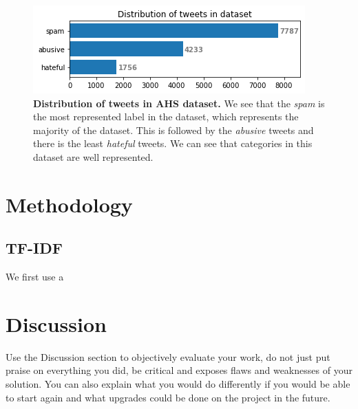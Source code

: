 \documentclass[fleqn,moreauthors,10pt]{ds_report}
\begin{document}
\begin{figure}[ht]\centering
	\includegraphics[width=\linewidth]{distribution_tweets_dataset2.png}
	\caption{\textbf{Distribution of tweets in AHS dataset.} We see that the \textit{spam} is the most represented label in the dataset, which represents the majority of the dataset. This is followed by the \textit{abusive} tweets and there is the least \textit{hateful} tweets. We can see that categories in this dataset are well represented.}
	\label{fig:distribution_tweets_dataset2}
\end{figure}

\section*{Methodology}
\subsection*{TF-IDF}
We first use a 


\section*{Discussion}

Use the Discussion section to objectively evaluate your work, do not just put praise on everything you did, be critical and exposes flaws and weaknesses of your solution. You can also explain what you would do differently if you would be able to start again and what upgrades could be done on the project in the future.




\end{document}
